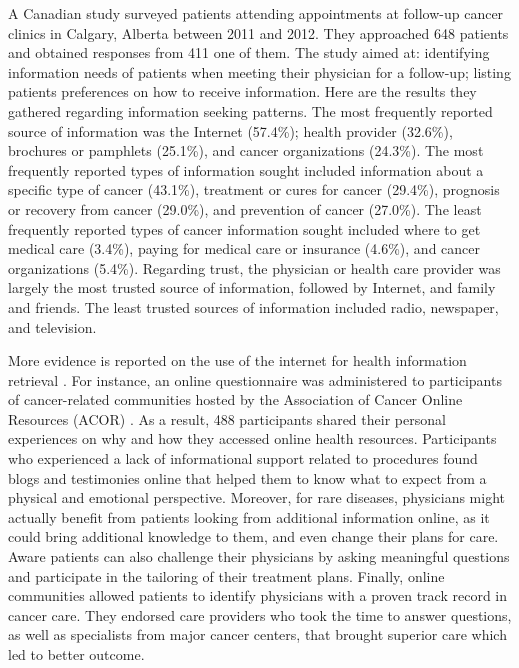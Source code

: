 A Canadian study surveyed patients attending appointments at follow-up cancer clinics in Calgary, Alberta \cite{sheabudgell_information_2014} between 2011 and 2012. They approached 648 patients and obtained responses from 411 one of them. The study aimed at: identifying information needs of patients when meeting their physician for a follow-up; listing patients preferences on how to receive information. Here are the results they gathered regarding information seeking patterns. The most frequently reported source of information was the Internet (57.4\%); health provider (32.6\%), brochures or pamphlets (25.1\%), and cancer organizations (24.3\%). The most frequently reported types of information sought included information about a specific type of cancer (43.1\%), treatment or cures for cancer (29.4\%), prognosis or recovery from cancer (29.0\%), and prevention of cancer (27.0\%). The least frequently reported types of cancer information sought included where to get medical care (3.4\%), paying for medical care or insurance (4.6\%), and cancer organizations (5.4\%). Regarding trust, the physician or health care provider was largely the most trusted source of information, followed by Internet, and family and friends. The least trusted sources of information included radio, newspaper, and television.

More evidence is reported on the use of the internet for health information retrieval \cite{chen_impact_2001,pereira_internet_2000,ziebland_how_2004,dolce_internet_2011}. For instance, an online questionnaire was administered to participants of cancer-related communities hosted by the Association of Cancer Online Resources (ACOR) \cite{dolce_internet_2011}. As a result, 488 participants shared their personal experiences on why and how they accessed online health resources. Participants who experienced a lack of informational support related to procedures found blogs and testimonies online that helped them to know what to expect from a physical and emotional perspective. Moreover, for rare diseases, physicians might actually benefit from patients looking from additional information online, as it could bring additional knowledge to them, and even change their plans for care. Aware patients can also challenge their physicians by asking meaningful questions and participate in the tailoring of their treatment plans. Finally, online communities allowed patients to identify physicians with a proven track record in cancer care. They endorsed care providers who took the time to answer questions, as well as specialists from major cancer centers, that brought superior care which led to better outcome.

